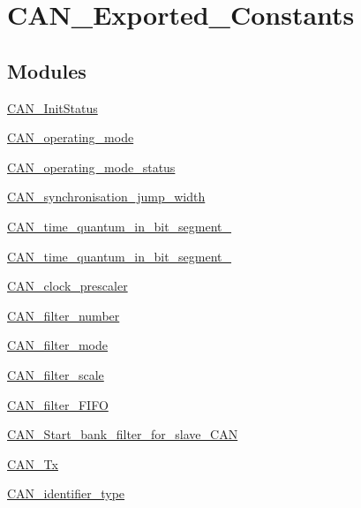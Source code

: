 \hypertarget{group___c_a_n___exported___constants}{\section{C\-A\-N\-\_\-\-Exported\-\_\-\-Constants}
\label{group___c_a_n___exported___constants}
}
\subsection*{Modules}
\begin{DoxyCompactItemize}
\item 
\hyperlink{group___c_a_n___init_status}{C\-A\-N\-\_\-\-Init\-Status}
\item 
\hyperlink{group___c_a_n__operating__mode}{C\-A\-N\-\_\-operating\-\_\-mode}
\item 
\hyperlink{group___c_a_n__operating__mode__status}{C\-A\-N\-\_\-operating\-\_\-mode\-\_\-status}
\item 
\hyperlink{group___c_a_n__synchronisation__jump__width}{C\-A\-N\-\_\-synchronisation\-\_\-jump\-\_\-width}
\item 
\hyperlink{group___c_a_n__time__quantum__in__bit__segment__1}{C\-A\-N\-\_\-time\-\_\-quantum\-\_\-in\-\_\-bit\-\_\-segment\-\_}
\item 
\hyperlink{group___c_a_n__time__quantum__in__bit__segment__2}{C\-A\-N\-\_\-time\-\_\-quantum\-\_\-in\-\_\-bit\-\_\-segment\-\_}
\item 
\hyperlink{group___c_a_n__clock__prescaler}{C\-A\-N\-\_\-clock\-\_\-prescaler}
\item 
\hyperlink{group___c_a_n__filter__number}{C\-A\-N\-\_\-filter\-\_\-number}
\item 
\hyperlink{group___c_a_n__filter__mode}{C\-A\-N\-\_\-filter\-\_\-mode}
\item 
\hyperlink{group___c_a_n__filter__scale}{C\-A\-N\-\_\-filter\-\_\-scale}
\item 
\hyperlink{group___c_a_n__filter___f_i_f_o}{C\-A\-N\-\_\-filter\-\_\-\-F\-I\-F\-O}
\item 
\hyperlink{group___c_a_n___start__bank__filter__for__slave___c_a_n}{C\-A\-N\-\_\-\-Start\-\_\-bank\-\_\-filter\-\_\-for\-\_\-slave\-\_\-\-C\-A\-N}
\item 
\hyperlink{group___c_a_n___tx}{C\-A\-N\-\_\-\-Tx}
\item 
\hyperlink{group___c_a_n__identifier__type}{C\-A\-N\-\_\-identifier\-\_\-type}
\item 

\end{DoxyCompactItemize}
